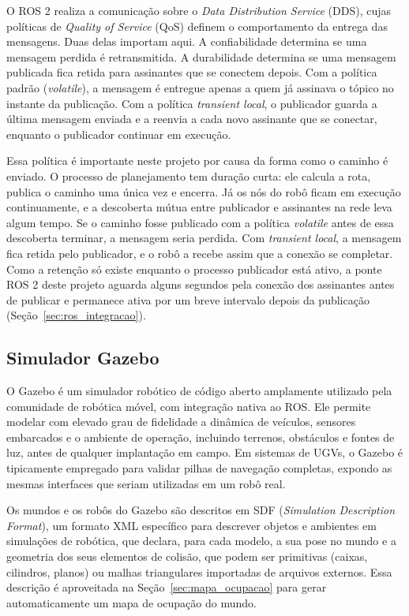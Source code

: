 \documentclass[
    12pt,
    openright,
    oneside,
    a4paper,
    english,
    brazil
]{abntex2}
\begin{document}
O ROS 2 realiza a comunicação sobre o \emph{Data Distribution Service} (DDS), cujas políticas de \emph{Quality of Service} (QoS) definem o comportamento da entrega das mensagens. Duas delas importam aqui. A confiabilidade determina se uma mensagem perdida é retransmitida. A durabilidade determina se uma mensagem publicada fica retida para assinantes que se conectem depois. Com a política padrão (\textit{volatile}), a mensagem é entregue apenas a quem já assinava o tópico no instante da publicação. Com a política \textit{transient local}, o publicador guarda a última mensagem enviada e a reenvia a cada novo assinante que se conectar, enquanto o publicador continuar em execução.

Essa política é importante neste projeto por causa da forma como o caminho é enviado. O processo de planejamento tem duração curta: ele calcula a rota, publica o caminho uma única vez e encerra. Já os nós do robô ficam em execução continuamente, e a descoberta mútua entre publicador e assinantes na rede leva algum tempo. Se o caminho fosse publicado com a política \textit{volatile} antes de essa descoberta terminar, a mensagem seria perdida. Com \textit{transient local}, a mensagem fica retida pelo publicador, e o robô a recebe assim que a conexão se completar. Como a retenção só existe enquanto o processo publicador está ativo, a ponte ROS 2 deste projeto aguarda alguns segundos pela conexão dos assinantes antes de publicar e permanece ativa por um breve intervalo depois da publicação (Seção~\ref{sec:ros_integracao}).

\subsection{Simulador Gazebo}
\label{sec:gazebo}

O Gazebo \cite{koenig2004} é um simulador robótico de código aberto amplamente utilizado pela comunidade de robótica móvel, com integração nativa ao ROS. Ele permite modelar com elevado grau de fidelidade a dinâmica de veículos, sensores embarcados e o ambiente de operação, incluindo terrenos, obstáculos e fontes de luz, antes de qualquer implantação em campo. Em sistemas de UGVs, o Gazebo é tipicamente empregado para validar pilhas de navegação completas, expondo as mesmas interfaces que seriam utilizadas em um robô real.

Os mundos e os robôs do Gazebo são descritos em SDF (\textit{Simulation Description Format}), um formato XML específico para descrever objetos e ambientes em simulações de robótica, que declara, para cada modelo, a sua pose no mundo e a geometria dos seus elementos de colisão, que podem ser primitivas (caixas, cilindros, planos) ou malhas triangulares importadas de arquivos externos. Essa descrição é aproveitada na Seção~\ref{sec:mapa_ocupacao} para gerar automaticamente um mapa de ocupação do mundo.
\end{document}
